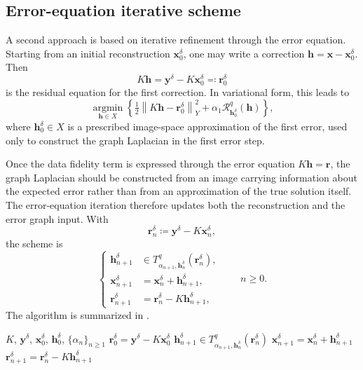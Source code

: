 \documentclass{article}
\theoremstyle{remark}
\newcommand{\norm}[1]{\left\lVert #1 \right\rVert}
\newcommand{\Rreg}{\mathcal{R}}
\newcommand{\bx}{{\bm{x}}}
\newcommand{\by}{{\bm{y}}}
\newcommand{\bh}{{\bm{h}}}
\newcommand{\br}{{\bm{r}}}
\begin{document}
\subsection{Error-equation iterative scheme}\label{sec:erreq}
A second approach is based on iterative refinement through the error equation. Starting from an initial reconstruction $\bx_0^\delta$, one may write a correction $\bh=\bx-\bx_0^\delta$. Then
\[
K\bh = \by^\delta-K\bx_0^\delta\eqqcolon \br_0^\delta
\]
is the residual equation for the first correction. In variational form, this leads to
\[
\underset{\bh\in X}{\operatorname{argmin}}
\left\{
\tfrac12\norm{K\bh-\br_0^\delta}_Y^2
+\alpha_1\Rreg_{\bh_0^\delta}^q(\bh)
\right\},
\]
where $\bh_0^\delta\in X$ is a prescribed image-space approximation of the first error, used only to construct the graph Laplacian in the first error step.

Once the data fidelity term is expressed through the error equation $K\bh=\br$, the graph Laplacian should be constructed from an image carrying information about the expected error rather than from an approximation of the true solution itself. The error-equation iteration therefore updates both the reconstruction and the error graph input. With
\[
\br_n^\delta\coloneqq\by^\delta-K\bx_n^\delta,
\]
the scheme is
\[
\left\{
\begin{aligned}
\bh_{n+1}^\delta
&\in T^q_{\alpha_{n+1},\bh_n^\delta}(\br_n^\delta),\\
\bx_{n+1}^\delta
&=\bx_n^\delta+\bh_{n+1}^\delta,\\
\br_{n+1}^\delta
&=\br_n^\delta-K\bh_{n+1}^\delta,
\end{aligned}
\right.
\qquad n\ge0.
\]
The algorithm is summarized in .

\begin{algorithm}[h!]
\caption{Error-equation iterative scheme}\label{alg:error-iter}
\begin{algorithmic}[1]
\REQUIRE $K$, $\by^\delta$, $\bx_0^\delta$, $\bh_0^\delta$, $\{\alpha_n\}_{n\ge1}$
\STATE $\br_0^\delta=\by^\delta-K\bx_0^\delta$
\STATE $\bh_{n+1}^\delta \in T^q_{\alpha_{n+1},\bh_n^\delta}(\br_n^\delta)$
\STATE $\bx_{n+1}^\delta=\bx_n^\delta+\bh_{n+1}^\delta$
\STATE $\br_{n+1}^\delta=\br_n^\delta-K\bh_{n+1}^\delta$
\ENDFOR
\end{algorithmic}
\end{algorithm}
\end{document}
